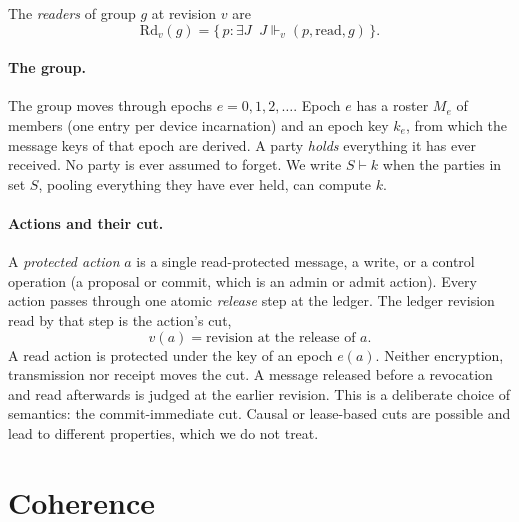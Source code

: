 \documentclass[aps,prx,reprint,superscriptaddress,nofootinbib,floatfix]{revtex4-2}
\theoremstyle{remark}
\newcommand{\justifies}{\Vdash}           %
\newcommand{\Rd}{\mathrm{Rd}}             %
\newcommand{\cut}{v}                      %
\newcommand{\roster}{M}
\newcommand{\derives}{\vdash}
\begin{document}
The \emph{readers} of group $g$ at revision $v$ are
\begin{equation}
\Rd_v(g)=\{\,p:\exists J\;\; J\justifies_v (p,\text{read},g)\,\}.
\label{eq:readers}
\end{equation}

\paragraph*{The group.} The group moves through epochs $e=0,1,2,\dots$. Epoch $e$ has a roster $\roster_e$ of members (one entry per device incarnation) and an epoch key $k_e$, from which the message keys of that epoch are derived. A party \emph{holds} everything it has ever received. No party is ever assumed to forget. We write $S\derives k$ when the parties in set $S$, pooling everything they have ever held, can compute $k$.

\paragraph*{Actions and their cut.} A \emph{protected action} $a$ is a single read-protected message, a write, or a control operation (a proposal or commit, which is an admin or admit action). Every action passes through one atomic \emph{release} step at the ledger. The ledger revision read by that step is the action's cut,
\begin{equation}
\cut(a)=\text{revision at the release of }a .
\label{eq:cut}
\end{equation}
A read action is protected under the key of an epoch $e(a)$. Neither encryption, transmission nor receipt moves the cut. A message released before a revocation and read afterwards is judged at the earlier revision. This is a deliberate choice of semantics: the commit-immediate cut. Causal or lease-based cuts are possible and lead to different properties, which we do not treat.

\section{Coherence}\label{sec:coherence}
\end{document}
